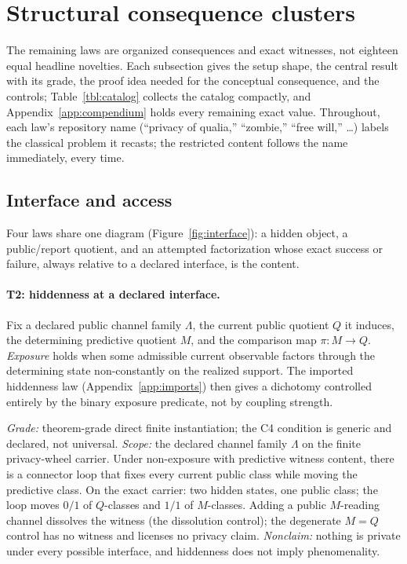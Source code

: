 \section{Structural consequence clusters}
\label{sec:clusters}

The remaining laws are organized consequences and exact witnesses, not
eighteen equal headline novelties. Each subsection gives the setup shape, the
central result with its grade, the proof idea needed for the conceptual
consequence, and the controls; Table~\ref{tbl:catalog} collects the catalog
compactly, and Appendix~\ref{app:compendium} holds every remaining exact
value. Throughout, each law's repository name (``privacy of qualia,''
``zombie,'' ``free will,'' \dots) labels the classical problem it recasts; the
restricted content follows the name immediately, every time.

\subsection{Interface and access}
\label{sec:interface}

Four laws share one diagram (Figure~\ref{fig:interface}): a hidden object, a
public/report quotient, and an attempted factorization whose exact success or
failure, always relative to a declared interface, is the content.

\paragraph{T2: hiddenness at a declared interface.}
Fix a declared public channel family $\Lambda$, the current public quotient
$Q$ it induces, the determining predictive quotient $M$, and the comparison
map $\pi : M \to Q$. \emph{Exposure} holds when some admissible current
observable factors through the determining state non-constantly on the
realized support. The imported hiddenness law (Appendix~\ref{app:imports})
then gives a dichotomy controlled entirely by the binary exposure predicate,
not by coupling strength.

\begin{theorem}
\gradeS{} \emph{Grade:} theorem-grade direct finite instantiation; the C4
condition is generic and declared, not universal. \emph{Scope:} the declared
channel family $\Lambda$ on the finite privacy-wheel carrier. Under
non-exposure with predictive witness content, there is a connector loop that
fixes every current public class while moving the predictive class. On the
exact carrier: two hidden states, one public class; the loop moves $0/1$ of
$Q$-classes and $1/1$ of $M$-classes. Adding a public $M$-reading channel
dissolves the witness (the dissolution control); the degenerate $M=Q$ control
has no witness and licenses no privacy claim. \emph{Nonclaim:} nothing is
private under every possible interface, and hiddenness does not imply
phenomenality.
\end{theorem}


